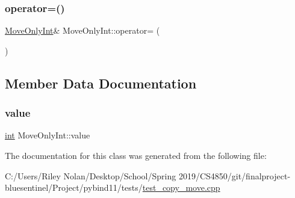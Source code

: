 \mbox{\label{class_move_only_int_a080476a798f7b0a8b8cfe34b564f5a03}} 
\subsubsection{\texorpdfstring{operator=()}{operator=()}\hspace{0.1cm}{\footnotesize\ttfamily [2/2]}}
{\footnotesize\ttfamily \mbox{\hyperlink{class_move_only_int}{Move\+Only\+Int}}\& Move\+Only\+Int\+::operator= (\begin{DoxyParamCaption}\item[{const \mbox{\hyperlink{class_move_only_int}{Move\+Only\+Int}} \&}]{ }\end{DoxyParamCaption})\hspace{0.3cm}{\ttfamily [delete]}}



\subsection{Member Data Documentation}
\mbox{\label{class_move_only_int_a52438f73215cbad2bf78fb79c06cf348}} 
\subsubsection{\texorpdfstring{value}{value}}
{\footnotesize\ttfamily \mbox{\hyperlink{warnings_8h_a74f207b5aa4ba51c3a2ad59b219a423b}{int}} Move\+Only\+Int\+::value}



The documentation for this class was generated from the following file\+:\begin{DoxyCompactItemize}
\item 
C\+:/\+Users/\+Riley Nolan/\+Desktop/\+School/\+Spring 2019/\+C\+S4850/git/finalproject-\/bluesentinel/\+Project/pybind11/tests/\mbox{\hyperlink{test__copy__move_8cpp}{test\+\_\+copy\+\_\+move.\+cpp}}\end{DoxyCompactItemize}
